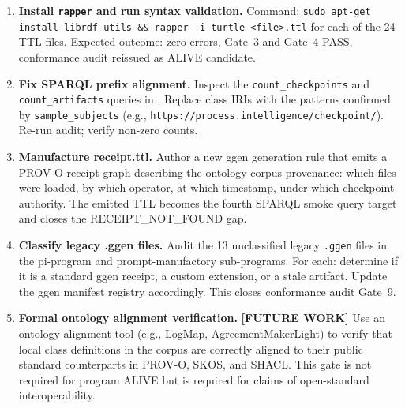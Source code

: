 \begin{enumerate}
  \item \textbf{Install \texttt{rapper} and run syntax validation.} Command:
        \texttt{sudo apt-get install librdf-utils \&\& rapper -i turtle <file>.ttl}
        for each of the 24 TTL files. Expected outcome: zero errors, Gate~3 and Gate~4
        PASS, conformance audit reissued as ALIVE candidate.

  \item \textbf{Fix SPARQL prefix alignment.} Inspect the
        \texttt{count\_checkpoints} and \texttt{count\_artifacts} queries in
        . Replace class IRIs with the patterns confirmed by
        \texttt{sample\_subjects} (e.g., \texttt{https://process.intelligence/checkpoint/}).
        Re-run audit; verify non-zero counts.

  \item \textbf{Manufacture receipt.ttl.} Author a new ggen generation rule that
        emits a PROV-O receipt graph describing the ontology corpus provenance:
        which files were loaded, by which operator, at which timestamp, under which
        checkpoint authority. The emitted TTL becomes the fourth SPARQL smoke query
        target and closes the RECEIPT\_NOT\_FOUND gap.

  \item \textbf{Classify legacy .ggen files.} Audit the 13 unclassified legacy
        \texttt{.ggen} files in the pi-program and prompt-manufactory sub-programs.
        For each: determine if it is a standard ggen receipt, a custom extension, or a
        stale artifact. Update the ggen manifest registry accordingly. This closes
        conformance audit Gate~9.

  \item \textbf{Formal ontology alignment verification.} \textbf{[FUTURE WORK]}
        Use an ontology alignment tool (e.g., LogMap, AgreementMakerLight) to verify
        that local class definitions in the corpus are correctly aligned to their
        public standard counterparts in PROV-O, SKOS, and SHACL. This gate is not
        required for program ALIVE but is required for claims of open-standard
        interoperability.
\end{enumerate}
